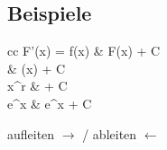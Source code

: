 \subsection{Beispiele}

\begin{table}[H]
	\begin{bigarray}
		\begin{array}{cc}
			F'(x) = f(x) & F(x) + C                \\
			\midrule
			  & \ln(x) + C              \\
			x^r          &  + C \\
			e^x          & e^x + C
		\end{array}
	\end{bigarray}
	\caption{aufleiten \( \rightarrow \) / ableiten \( \leftarrow \)}
\end{table}
